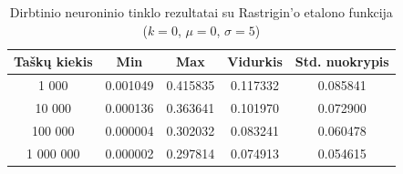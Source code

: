\begin{table}[H]
    \centering
    \begin{tabular}{|c|c|c|c|c|}
        \hline
        \textbf{Taškų kiekis} & \textbf{Min} & \textbf{Max} & \textbf{Vidurkis} & \textbf{Std. nuokrypis} \\ \hline
        1 000        & 0.001049 & 0.415835 & 0.117332 & 0.085841 \\ \hline
        10 000       & 0.000136 & 0.363641 & 0.101970 & 0.072900 \\ \hline
        100 000      & 0.000004 & 0.302032 & 0.083241 & 0.060478 \\ \hline
        1 000 000    & 0.000002 & 0.297814 & 0.074913 & 0.054615 \\ \hline
    \end{tabular}
    \caption{Dirbtinio neuroninio tinklo rezultatai su Rastrigin'o etalono funkcija ($k = 0$, $\mu = 0$, $\sigma = 5$)}
\end{table}